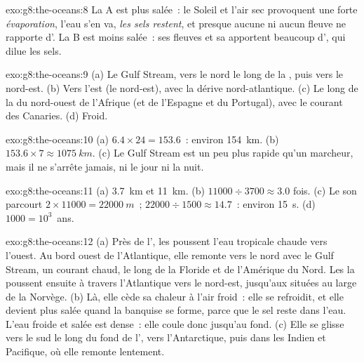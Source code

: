 \begin{solution}{exo:g8:the-oceans:8}
La  A est plus salée~: le Soleil et l'air sec provoquent une forte
\emph{évaporation}, l'eau s'en va, \emph{les sels restent}, et presque
aucune  ni aucun fleuve ne rapporte d'\emph{}. La  B est
moins salée~: ses fleuves et sa  apportent beaucoup d'\emph{},
qui dilue les sels.
\end{solution}

\begin{solution}{exo:g8:the-oceans:9}
(a) Le Gulf Stream, vers le nord le long de la , puis vers le
nord-est. (b) Vers l'est (le nord-est), avec la dérive nord-atlantique.
(c) Le long de la  du nord-ouest de l'Afrique (et de l'Espagne et du
Portugal), avec le courant des Canaries. (d) Froid.
\end{solution}

\begin{solution}{exo:g8:the-oceans:10}
(a) $6.4 \times 24 = 153.6$~: environ \qty{154}{km}. (b) $153.6 \times 7
\approx \qty{1075}{km}$. (c) Le Gulf Stream est un peu plus rapide qu'un
marcheur, mais il ne s'arrête jamais, ni le jour ni la nuit.
\end{solution}

\begin{solution}{exo:g8:the-oceans:11}
(a) \qty{3.7}{km} et \qty{11}{km}. (b) $11000 \div 3700 \approx 3.0$
fois. (c) Le son parcourt $2 \times 11000 = \qty{22000}{m}$~; $22000
\div 1500 \approx 14.7$~: environ \qty{15}{s}. (d) $1000 = 10^3$~ans.
\end{solution}

\begin{solution}{exo:g8:the-oceans:12}
(a) Près de l', les  poussent l'eau tropicale chaude vers
l'ouest. Au bord ouest de l'Atlantique, elle remonte vers le nord avec le
Gulf Stream, un courant chaud, le long de la Floride et de l'Amérique du
Nord. Les  la poussent ensuite à travers l'Atlantique vers le
nord-est, jusqu'aux  situées au large de la Norvège. (b) Là, elle cède
sa chaleur à l'air froid~: elle se refroidit, et elle devient plus salée
quand la banquise se forme, parce que le sel reste dans l'eau. L'eau
froide et salée est dense~: elle coule donc jusqu'au fond. (c) Elle se
glisse vers le sud le long du fond de l', vers l'Antarctique, puis
dans les  Indien et Pacifique, où elle remonte lentement.
\end{solution}

